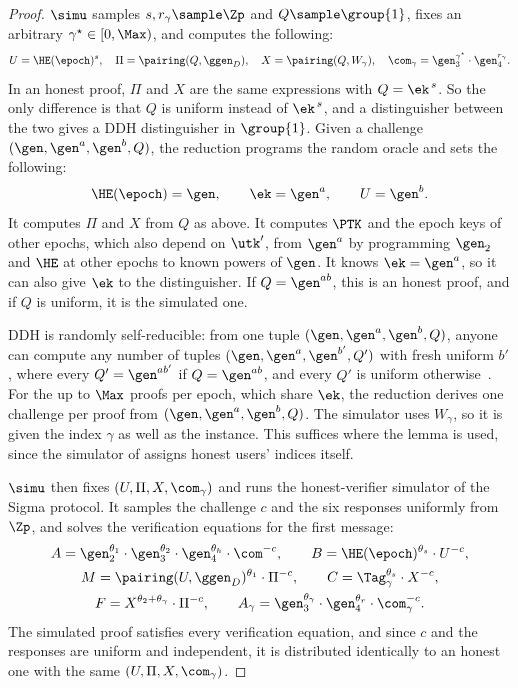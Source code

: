 \begin{proof}
  $\simu$ samples $s, r_\gamma \sample \Zp$ and $Q \sample \group{1}$, fixes an
arbitrary $\gamma^\star \in [0,\Max)$, and computes the following:
  \begin{equation*}
    U = \HE(\epoch)^{s}, \quad \Pi = \pairing(Q, \ggen_D), \quad X =
\pairing(Q, W_\gamma), \quad \com_\gamma =
\gen_3^{\gamma^\star}\cdot\gen_4^{r_\gamma}.
  \end{equation*}
  In an honest proof, $\Pi$ and $X$ are the same expressions with $Q =
\ek^{\,s}$. So the only difference is that $Q$ is uniform instead of $\ek^{\,s}$,
and a distinguisher between the two gives a DDH distinguisher in $\group{1}$.
Given a challenge $(\gen, \gen^a, \gen^b, Q)$, the reduction programs the random
oracle and sets the following:
  \begin{equation*}
    \HE(\epoch) = \gen, \qquad \ek = \gen^a, \qquad U = \gen^b.
  \end{equation*}
  It computes $\Pi$ and $X$ from $Q$ as above. It computes $\PTK$ and the epoch
keys of other epochs, which also depend on $\utk'$, from $\gen^a$ by programming
$\gen_2$ and $\HE$ at other epochs to known powers of $\gen$. It knows $\ek =
\gen^a$, so it can also give $\ek$ to the distinguisher. If $Q = \gen^{ab}$, this
is an honest proof, and if $Q$ is uniform, it is the simulated one.

DDH is randomly self-reducible: from one tuple $(\gen, \gen^a, \gen^b, Q)$,
anyone can compute any number of tuples $(\gen, \gen^a, \gen^{b'}, Q')$ with
fresh uniform $b'$, where every $Q' = \gen^{ab'}$ if $Q = \gen^{ab}$, and every
$Q'$ is uniform otherwise~\cite{FOCS:NaoRei97}. For the up
to $\Max$ proofs per epoch, which share $\ek$, the reduction derives one
challenge per proof from $(\gen, \gen^a, \gen^b, Q)$. The simulator uses $W_\gamma$, so it is given the
index $\gamma$ as well as the instance. This suffices where the lemma is used,
since the simulator of  assigns honest users' indices
itself.

  $\simu$ then fixes $(U, \Pi, X, \com_\gamma)$ and runs the honest-verifier
simulator of the Sigma protocol. It samples the challenge $c$ and the six
responses uniformly from $\Zp$, and solves the verification equations for the
first message:
  \begin{gather*}
    A = \gen_2^{\theta_1}\cdot\gen_3^{\theta_2}\cdot\gen_4^{\theta_h}\cdot
\com^{-c}, \qquad B = \HE(\epoch)^{\theta_s}\cdot U^{-c}, \\ M =
\pairing(U,\ggen_D)^{\theta_1}\cdot \Pi^{-c}, \qquad
    C = \Tag_\gamma^{\theta_s}\cdot X^{-c}, \\ F =
X^{\theta_2+\theta_\gamma}\cdot\Pi^{-c}, \qquad A_\gamma =
\gen_3^{\theta_\gamma}\cdot\gen_4^{\theta_r}\cdot \com_\gamma^{-c}.
  \end{gather*}
  The simulated proof satisfies every verification equation, and since $c$ and
the responses are uniform and independent, it is distributed identically to an
honest one with the same $(U, \Pi, X, \com_\gamma)$.


\end{proof}
